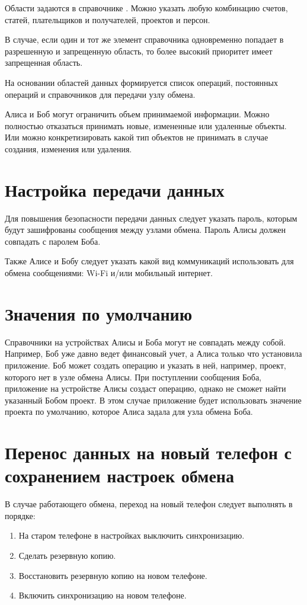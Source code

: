 \documentclass[a4paper,10pt,russian]{sphinxmanual}
\begin{document}
Области задаются в справочнике . Можно указать любую комбинацию счетов, статей, плательщиков и получателей,
проектов и персон.

В случае, если один и тот же элемент справочника одновременно попадает в разрешенную и запрещенную область, то более
высокий приоритет имеет запрещенная область.

На основании областей данных формируется список операций, постоянных операций и справочников для передачи узлу обмена.

Алиса и Боб могут ограничить объем принимаемой информации. Можно полностью отказаться принимать новые, измененные или удаленные объекты.
Или можно конкретизировать какой тип объектов не принимать в случае создания, изменения или удаления.


\section{Настройка передачи данных}
\label{\detokenize{teamwork:id9}}
Для повышения безопасности передачи данных следует указать пароль, которым будут зашифрованы сообщения между узлами обмена. Пароль Алисы должен совпадать с паролем Боба.

Также Алисе и Бобу следует указать какой вид коммуникаций использовать для обмена сообщениями: Wi-Fi и/или мобильный интернет.


\section{Значения по умолчанию}
\label{\detokenize{teamwork:id10}}
Справочники на устройствах Алисы и Боба могут не совпадать между собой. Например, Боб уже давно
ведет финансовый учет, а Алиса только что установила приложение. Боб может создать операцию и указать в ней, например,
проект, которого нет в узле обмена Алисы. При поступлении сообщения Боба, приложение на устройстве Алисы
создаст операцию, однако не сможет найти указанный Бобом проект. В этом случае приложение будет использовать
значение проекта по умолчанию, которое Алиса задала для узла обмена Боба.


\section{Перенос данных на новый телефон с сохранением настроек обмена}
\label{\detokenize{teamwork:id11}}
В случае работающего обмена, переход на новый телефон следует выполнять в порядке:
\begin{enumerate}
\def\theenumi{\arabic{enumi}}
\def\labelenumi{\theenumi .}
\makeatletter\def\p@enumii{\p@enumi \theenumi .}\makeatother
\item {} 
На старом телефоне в настройках выключить синхронизацию.

\item {} 
Сделать резервную копию.

\item {} 
Восстановить резервную копию на новом телефоне.

\item {} 
Включить синхронизацию на новом телефоне.

\end{enumerate}
\end{document}
